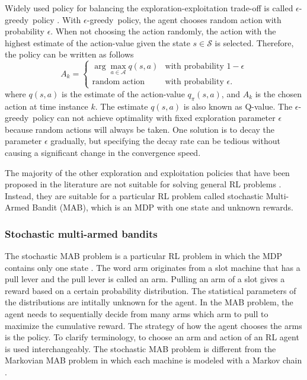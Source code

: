 \documentclass[english, 12pt, a4paper, elec, utf8, a-1b, online]{aaltothesis}
\newcommand{\Ss}{\mathcal{S}}
\newcommand{\As}{\mathcal{A}}
\newcommand{\egreedy}{$\epsilon$-greedy~}
\begin{document}
Widely used policy for balancing the exploration-exploitation trade-off is called \egreedy policy \cite{Sutton2018}.
With \egreedy policy, the agent chooses random action with probability $\epsilon$.
When not choosing the action randomly, the action with the highest estimate of the action-value given the state $s \in \Ss$ is selected.
Therefore, the policy can be written as follows
\begin{equation}\label{eq:epsilon_greedy}
    A_k =
    \left\{
        \begin{array}{ll}
            \arg\max_{a \in \As} q(s, a) & \text{with probability $1-\epsilon$}\\
            \text{random action} & \text{with probability $\epsilon$}.
        \end{array}
    \right.
\end{equation}
where $q(s, a)$ is the estimate of the action-value $q_\pi(s, a)$, and $A_k$ is the chosen action at time instance $k$.
The estimate $q(s, a)$ is also known as Q-value.
The \egreedy policy can not achieve optimality with fixed exploration parameter $\epsilon$ because random actions will always be taken.
One solution is to decay the parameter $\epsilon$ gradually, but specifying the decay rate can be tedious without causing a significant change in the convergence speed.

The majority of the other exploration and exploitation policies that have been proposed in the literature are not suitable for solving general RL problems \cite{Lattimore2019}.
Instead, they are suitable for a particular RL problem called stochastic Multi-Armed Bandit (MAB), which is an MDP with one state and unknown rewards.

\subsubsection{Stochastic multi-armed bandits}\label{sec:MAB}

The stochastic MAB problem is a particular RL problem in which the MDP contains only one state \cite{Sutton2018}.
The word arm originates from a slot machine that has a pull lever and the pull lever is called an arm.
Pulling an arm of a slot gives a reward based on a certain probability distribution. 
The statistical parameters of the distributions are intitally unknown for the agent.
In the MAB problem, the agent needs to sequentially decide from many arms which arm to pull to maximize the cumulative reward.
The strategy of how the agent chooses the arms is the policy.
To clarify terminology, to choose an arm and action of an RL agent is used interchangeably.
The stochastic MAB problem is different from the Markovian MAB problem in which each machine is modeled with a Markov chain \cite{Katehakis1987}.
\end{document}
